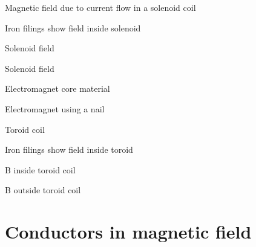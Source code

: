 \documentclass[compress]{beamer}
\begin{document}
{
    \begin{frame}{Magnetic field due to current flow in a solenoid coil}
    \end{frame}
}

{
    \begin{frame}{Iron filings show field inside solenoid}
    \end{frame}
}

{
    \begin{frame}{Solenoid field}
    \end{frame}
}

{
    \begin{frame}{Solenoid field}
    \end{frame}
}



{
    \begin{frame}{Electromagnet core material}
    \end{frame}
}

{
    \begin{frame}{Electromagnet using a nail}
    \end{frame}
}

{
    \begin{frame}{Toroid coil}
    \end{frame}
}

{
    \begin{frame}{Iron filings show field inside toroid}
    \end{frame}
}

{
    \begin{frame}{B inside toroid coil}
    \end{frame}
}

{
    \begin{frame}{B outside toroid coil}
    \end{frame}
}

\section{Conductors in magnetic field}
\end{document}
